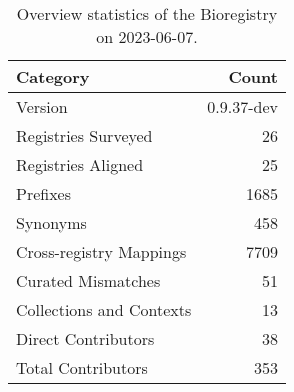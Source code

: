 \begin{table}
\caption{Overview statistics of the Bioregistry on 2023-06-07.}
\label{tab:bioregistry-summary}
\begin{tabular}{lr}
\toprule
Category & Count \\
\midrule
Version & 0.9.37-dev \\
Registries Surveyed & 26 \\
Registries Aligned & 25 \\
Prefixes & 1685 \\
Synonyms & 458 \\
Cross-registry Mappings & 7709 \\
Curated Mismatches & 51 \\
Collections and Contexts & 13 \\
Direct Contributors & 38 \\
Total Contributors & 353 \\
\bottomrule
\end{tabular}
\end{table}

